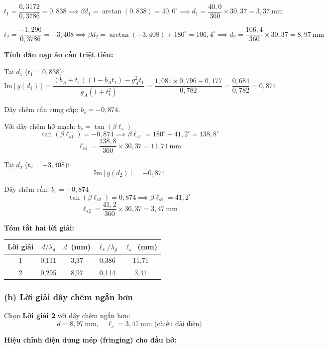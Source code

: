 \documentclass[12pt,a4paper]{article}
\begin{document}
\[
t_1 = \frac{0{,}3172}{0{,}3786} = 0{,}838 \implies \beta d_1 = \arctan(0{,}838) = 40{,}0^\circ \implies d_1 = \frac{40{,}0}{360} \times 30{,}37 = 3{,}37~\text{mm}
\]

\[
t_2 = \frac{-1{,}290}{0{,}3786} = -3{,}408 \implies \beta d_2 = \arctan(-3{,}408) + 180^\circ = 106{,}4^\circ \implies d_2 = \frac{106{,}4}{360} \times 30{,}37 = 8{,}97~\text{mm}
\]

\textbf{Tính dẫn nạp ảo cần triệt tiêu:}

Tại $d_1$ ($t_1 = 0{,}838$):
\[
\text{Im}[y(d_1)] = \frac{(b_A + t_1)(1 - b_A t_1) - g_A^2 t_1}{g_A(1 + t_1^2)} = \frac{1{,}081 \times 0{,}796 - 0{,}177}{0{,}782} = \frac{0{,}684}{0{,}782} = 0{,}874
\]

Dây chêm cần cung cấp: $b_s = -0{,}874$.

Với dây chêm hở mạch: $b_s = \tan(\beta\ell_s)$
\[
\tan(\beta\ell_{s1}) = -0{,}874 \implies \beta\ell_{s1} = 180^\circ - 41{,}2^\circ = 138{,}8^\circ
\]
\[
\ell_{s1} = \frac{138{,}8}{360} \times 30{,}37 = 11{,}71~\text{mm}
\]

Tại $d_2$ ($t_2 = -3{,}408$):
\[
\text{Im}[y(d_2)] = -0{,}874
\]

Dây chêm cần: $b_s = +0{,}874$
\[
\tan(\beta\ell_{s2}) = 0{,}874 \implies \beta\ell_{s2} = 41{,}2^\circ
\]
\[
\ell_{s2} = \frac{41{,}2}{360} \times 30{,}37 = 3{,}47~\text{mm}
\]

\textbf{Tóm tắt hai lời giải:}

\begin{center}
\begin{tabular}{|c|c|c|c|c|}
\hline
\textbf{Lời giải} & $d/\lambda_g$ & $d$~(mm) & $\ell_s/\lambda_g$ & $\ell_s$~(mm) \\
\hline
1 & 0{,}111 & 3{,}37 & 0{,}386 & 11{,}71 \\
\hline
2 & 0{,}295 & 8{,}97 & 0{,}114 & 3{,}47 \\
\hline
\end{tabular}
\end{center}

\subsubsection{(b) Lời giải dây chêm ngắn hơn}

Chọn \textbf{Lời giải 2} với dây chêm ngắn hơn:
\[
\boxed{d = 8{,}97~\text{mm}, \quad \ell_s = 3{,}47~\text{mm} \text{ (chiều dài điện)}}
\]

\textbf{Hiệu chỉnh điện dung mép (fringing) cho đầu hở:}
\end{document}
